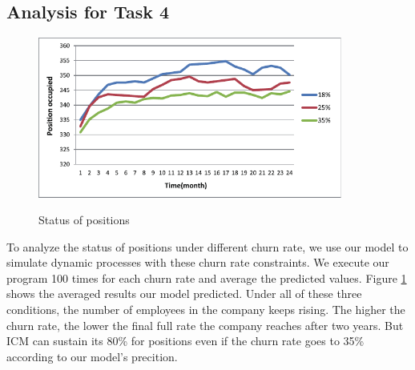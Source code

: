 \documentclass[12pt,a4paper,titlepage]{article}
\begin{document}
\subsection{Analysis for Task 4}
\label{sec:analysis-for-task-4}


\begin{figure}[htb]
  \centering
  \includegraphics[width=10cm]{task4_p.pdf}\\
  \caption{Status of positions}\label{t4_p}
\end{figure}

To analyze the status of positions under different churn rate, we use our model to simulate dynamic processes with these churn rate constraints. We execute our program 100 times for each churn rate and average the predicted values. Figure \ref{t4_p} shows the averaged results our model predicted. Under all of these three conditions, the number of employees in the company keeps rising. The higher the churn rate, the lower the final full rate the company reaches after two years. But ICM can sustain its 80\% for positions even if the churn rate goes to 35\% according to our model's precition.
\end{document}
